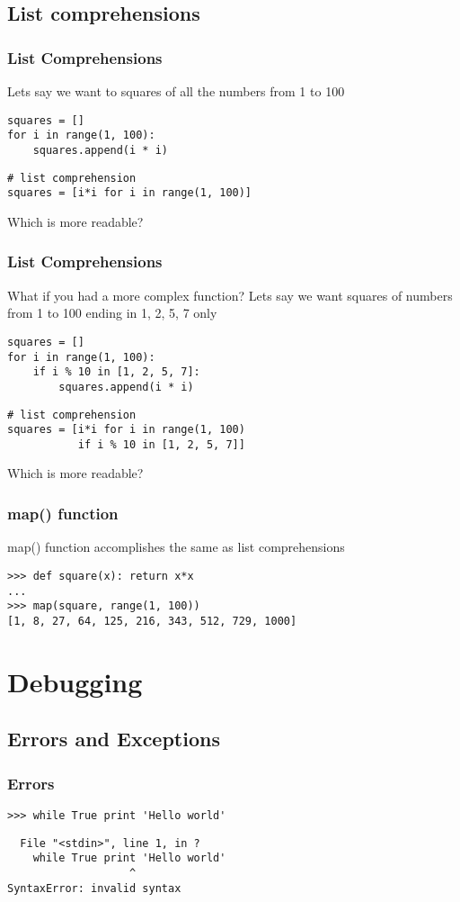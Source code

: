 \documentclass[14pt,compress]{beamer}
\newcounter{time}
\newcommand{\inctime}[1]{\addtocounter{time}{#1}{\tiny \thetime\ m}}
\begin{document}
\subsection{List comprehensions}
\begin{frame}[fragile]
    \frametitle{List Comprehensions}
Lets say we want to squares of all the numbers from 1 to 100
    \begin{lstlisting}
squares = []
for i in range(1, 100):
    squares.append(i * i)
    \end{lstlisting}
    \begin{lstlisting}
# list comprehension
squares = [i*i for i in range(1, 100)]
     \end{lstlisting}
Which is more readable?
\end{frame}

\begin{frame}[fragile]
    \frametitle{List Comprehensions}
What if you had a more complex function?
Lets say we want squares of numbers from 1 to 100 ending in 1, 2, 5, 7 only
    \begin{lstlisting}
squares = []
for i in range(1, 100):
    if i % 10 in [1, 2, 5, 7]:
        squares.append(i * i)
    \end{lstlisting}
    \begin{lstlisting}
# list comprehension
squares = [i*i for i in range(1, 100)
           if i % 10 in [1, 2, 5, 7]]
     \end{lstlisting}
Which is more readable?
\end{frame}

\begin{frame}[fragile]
    \frametitle{map() function}
    map() function accomplishes the same as list comprehensions
    \begin{lstlisting}
>>> def square(x): return x*x
...
>>> map(square, range(1, 100))
[1, 8, 27, 64, 125, 216, 343, 512, 729, 1000]
    \end{lstlisting}
\inctime{15}
\end{frame}

\section{Debugging}
\subsection{Errors and Exceptions}
\begin{frame}[fragile]
 \frametitle{Errors}
 \begin{lstlisting}
>>> while True print 'Hello world'
 \end{lstlisting}
\pause
  \begin{lstlisting}
  File "<stdin>", line 1, in ?
    while True print 'Hello world'
                   ^
SyntaxError: invalid syntax
\end{lstlisting}
\end{frame}
\end{document}
